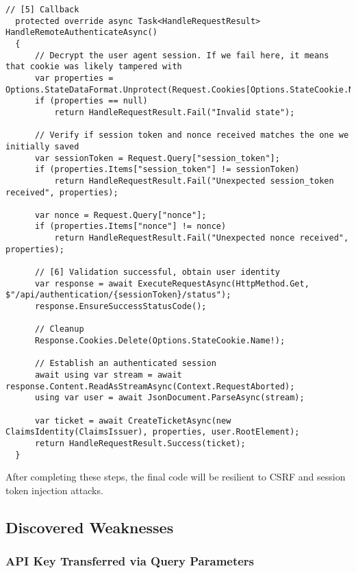 \begin{lstlisting}[caption={Handling access token creation}, label={lst:dokobit-handleremote}]
  // [5] Callback
  protected override async Task<HandleRequestResult> HandleRemoteAuthenticateAsync()
  {
      // Decrypt the user agent session. If we fail here, it means that cookie was likely tampered with
      var properties = Options.StateDataFormat.Unprotect(Request.Cookies[Options.StateCookie.Name!]);
      if (properties == null)
          return HandleRequestResult.Fail("Invalid state");
  
      // Verify if session token and nonce received matches the one we initially saved
      var sessionToken = Request.Query["session_token"];
      if (properties.Items["session_token"] != sessionToken)
          return HandleRequestResult.Fail("Unexpected session_token received", properties);

      var nonce = Request.Query["nonce"];
      if (properties.Items["nonce"] != nonce)
          return HandleRequestResult.Fail("Unexpected nonce received", properties);
  
      // [6] Validation successful, obtain user identity
      var response = await ExecuteRequestAsync(HttpMethod.Get, $"/api/authentication/{sessionToken}/status");
      response.EnsureSuccessStatusCode();
  
      // Cleanup
      Response.Cookies.Delete(Options.StateCookie.Name!);
  
      // Establish an authenticated session
      await using var stream = await response.Content.ReadAsStreamAsync(Context.RequestAborted);
      using var user = await JsonDocument.ParseAsync(stream);
  
      var ticket = await CreateTicketAsync(new ClaimsIdentity(ClaimsIssuer), properties, user.RootElement);
      return HandleRequestResult.Success(ticket);
  }
\end{lstlisting}

After completing these steps, the final code will be resilient to CSRF and session token injection attacks.

\subsection{Discovered Weaknesses}

\subsubsection{API Key Transferred via Query Parameters}

